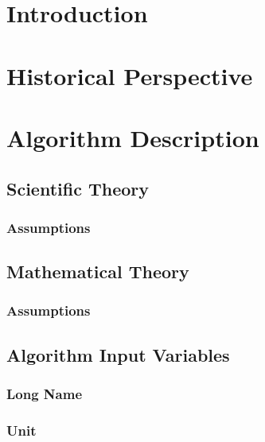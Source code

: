 \documentclass[12pt]{article}
\begin{document}
\maketitle

\tableofcontents

\section{Introduction}
\Introduction

\section{Historical Perspective}
\HistoricalPerspective

\section{Algorithm Description}
\AlgDesc

\subsection{Scientific Theory}
\ScientificTheory

\subsubsection{Assumptions}
\ScientificTheoryAssumptions

\subsection{Mathematical Theory}
\MathematicalTheory

\subsubsection{Assumptions}
\MathematicalTheoryAssumptions

\subsection{Algorithm Input Variables}
\AlgorithmInputVariables

\subsubsection{Long Name}
\AlgorthimInputVariablesLongName

\subsubsection{Unit}
\AlgorthimInputVariablesUnit
\end{document}
